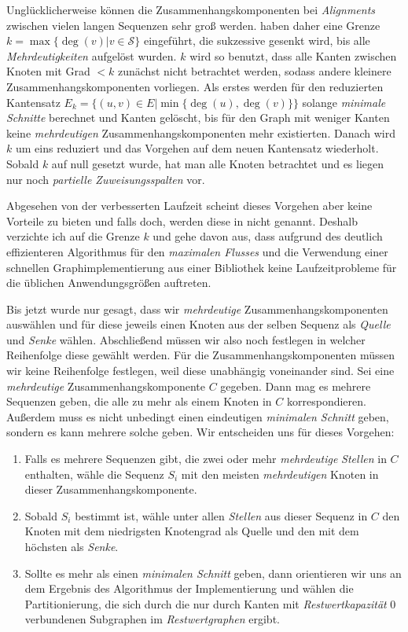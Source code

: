 Unglücklicherweise können die Zusammenhangskomponenten bei \emph{Alignments} zwischen vielen langen Sequenzen sehr groß werden. \cite{cpm10} haben daher eine Grenze $k = \max\{\deg(v)| v \in \mathcal{S}\}$ eingeführt, die sukzessive gesenkt wird, bis alle \emph{Mehrdeutigkeiten} aufgelöst wurden. $k$ wird so benutzt, dass alle Kanten zwischen Knoten mit Grad $< k$ zunächst nicht betrachtet werden, sodass andere kleinere Zusammenhangskomponenten vorliegen. Als erstes werden für den reduzierten Kantensatz $E_k = \{(u,v) \in E|\min\{\deg(u),\deg(v)\}\}$ solange \emph{minimale Schnitte} berechnet und Kanten gelöscht, bis für den Graph mit weniger Kanten keine \emph{mehrdeutigen} Zusammenhangskomponenten mehr existierten. Danach wird $k$ um eins reduziert und das Vorgehen auf dem neuen Kantensatz wiederholt. Sobald $k$ auf null gesetzt wurde, hat man alle Knoten betrachtet und es liegen nur noch \emph{partielle Zuweisungsspalten} vor.

Abgesehen von der verbesserten Laufzeit scheint dieses Vorgehen aber keine Vorteile zu bieten und falls doch, werden diese in \cite{cpm10} nicht genannt. Deshalb verzichte ich auf die Grenze $k$ und gehe davon aus, dass aufgrund des deutlich effizienteren Algorithmus für den \emph{maximalen Flusses} und die Verwendung einer schnellen Graphimplementierung aus einer Bibliothek keine Laufzeitprobleme für die üblichen Anwendungsgrößen auftreten.

Bis jetzt wurde nur gesagt, dass wir \emph{mehrdeutige} Zusammenhangskomponenten auswählen und für diese jeweils einen Knoten aus der selben Sequenz als \emph{Quelle} und \emph{Senke} wählen. Abschließend müssen wir also noch festlegen in welcher Reihenfolge diese gewählt werden. Für die Zusammenhangskomponenten müssen wir keine Reihenfolge festlegen, weil diese unabhängig voneinander sind. Sei eine \emph{mehrdeutige} Zusammenhangskomponente $C$ gegeben. Dann mag es mehrere Sequenzen geben, die alle zu mehr als einem Knoten in $C$ korrespondieren. Außerdem muss es nicht unbedingt einen eindeutigen \emph{minimalen Schnitt} geben, sondern es kann mehrere solche geben. Wir entscheiden uns für dieses Vorgehen:

\begin{enumerate}[topsep=0pt,itemsep=-1ex,partopsep=1ex,parsep=1ex]
	\item Falls es mehrere Sequenzen gibt, die zwei oder mehr \emph{mehrdeutige} \emph{Stellen} in $C$ enthalten, wähle die Sequenz $S_i$ mit den meisten \emph{mehrdeutigen} Knoten in dieser Zusammenhangskomponente.
	\item Sobald $S_i$ bestimmt ist, wähle unter allen \emph{Stellen} aus dieser Sequenz in $C$ den Knoten mit dem niedrigsten Knotengrad als Quelle und den mit dem höchsten als \emph{Senke}.
	\item Sollte es mehr als einen \emph{minimalen Schnitt} geben, dann orientieren wir uns an dem Ergebnis des Algorithmus der Implementierung und wählen die Partitionierung, die sich durch die nur durch Kanten mit \emph{Restwertkapazität} 0 verbundenen Subgraphen im \emph{Restwertgraphen} ergibt. 
\end{enumerate}


